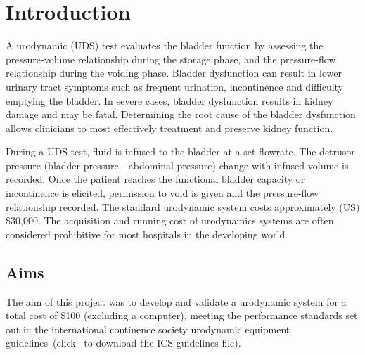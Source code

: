 \section{Introduction}

A urodynamic (UDS) test evaluates the bladder function by assessing the pressure-volume relationship during the storage phase, and the pressure-flow relationship during the voiding phase. Bladder dysfunction can result in lower urinary tract symptoms such as frequent urination, incontinence and difficulty emptying the bladder. In severe cases, bladder dysfunction results in kidney damage and may be fatal. Determining the root cause of the bladder dysfunction allows clinicians to most effectively treatment and preserve kidney function.  

During a UDS test, fluid is infused to the bladder at a set flowrate. The detrusor pressure (bladder pressure - abdominal pressure) change with infused volume is recorded. Once the patient reaches the functional bladder capacity or incontinence is elicited, permission to void is given and the pressure-flow relationship recorded. 
The standard urodynamic system costs approximately (US) \$30,000. The acquisition and running cost of urodynamics systems are often considered prohibitive for most hospitals in the developing world.


\subsection{Aims}
The aim of this project was to develop and validate a urodynamic system for a total cost of \$100 (excluding a computer), meeting the performance standards set out in the international continence society urodynamic equipment guidelines\ (click \icsguidelines \ to download the ICS guidelines file).

\clearpage